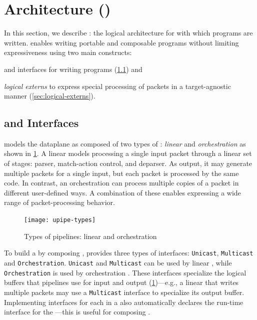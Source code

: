 \documentclass[letterpaper,twocolumn,10pt]{article}
\begin{document}
\section{\uswitch Architecture (\uarch)}
\label{sec:architecture}
In this section, we describe \uarch: the logical architecture for
\uswitch with which \ulang programs are written. \uarch enables
writing portable and composable programs without limiting
expressiveness using two main constructs:
\begin{enumerate*}[label=(\roman*)]
  \item \emph{\upipelines} and interfaces for writing \ulang programs
    (\cref{sec:pipelines}) and
  \item \emph{logical externs} to express special processing of
    packets in a target-agnostic manner (\cref{sec:logical-externs}).
\end{enumerate*}


\subsection{\upipelines and Interfaces}
\label{sec:pipelines}

%
\uarch models the dataplane as composed of two types of \upipelines:
\emph{linear} and \emph{orchestration} as shown in
\cref{fig:pipe-types}. A linear \upipeline models processing a single
input packet through a linear set of stages: parser, match-action
control, and deparser.  As output, it may generate multiple packets
for a single input, but each packet is processed by the same code. In
contrast, an orchestration \upipeline can process multiple copies of a
packet in different user-defined ways. A combination of these
\upipelines enables expressing a wide range of packet-processing
behavior.
\begin{figure}[!tbp]
  \centering
  \texttt{[image: upipe-types]}
  \caption{Types of \uarch pipelines: linear and orchestration}
  \label{fig:pipe-types}
\end{figure}

%
To build a \uprogram by composing \upipelines, \uarch provides three
types of interfaces: \texttt{Unicast}, \texttt{Multicast} and
\texttt{Orchestration}.  \texttt{Unicast} and \texttt{Multicast} can
be used by linear \upipelines, while \texttt{Orchestration} is used by
orchestration \upipelines. These interfaces specialize the logical
buffers that pipelines use for input and output
(\cref{fig:pipe-types})---e.g., a linear \upipeline that writes
multiple packets may use a \texttt{Multicast} interface to specialize
its output buffer. Implementing interfaces for each \upipeline in a
\uprogram also automatically declares the run-time interface for the
\uprogram---this is useful for composing \uprograms.
\end{document}
